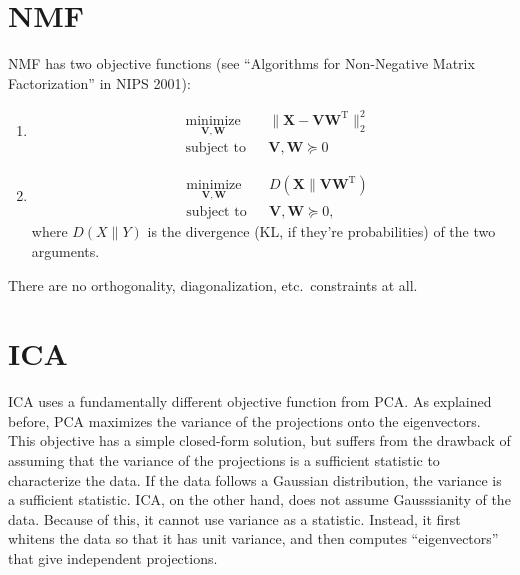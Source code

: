 \documentclass{article}
\newcommand{\transpose}{^\mathrm{T}}
\begin{document}
\section*{NMF}
NMF has two objective functions (see ``Algorithms for Non-Negative Matrix Factorization'' in NIPS 2001):
\begin{enumerate}
\item \begin{equation}
\begin{aligned}
&\underset{\mathbf{V}, \mathbf{W}}{\text{minimize}} &&\| \mathbf{X} - \mathbf{VW}\transpose\|_2^2 \\ 
& \text{subject to} & &\mathbf{V,W} \succeq 0 
\end{aligned}
\end{equation}
\item
\begin{equation}
\begin{aligned}
&\underset{\mathbf{V}, \mathbf{W}}{\text{minimize}} && D\left(\mathbf{X} \|  \mathbf{VW}\transpose\right) \\ 
& \text{subject to} & &\mathbf{V,W} \succeq 0, 
\end{aligned}
\end{equation}
where $D\left(X\|Y\right)$ is the divergence (KL, if they're probabilities) of the two arguments.
\end{enumerate}
There are no orthogonality, diagonalization, etc.\ constraints at all. 

\section*{ICA}
ICA uses a fundamentally different objective function from PCA. As explained before,  PCA maximizes the variance of the projections onto the eigenvectors.  This objective has a simple closed-form solution, but suffers from the drawback of assuming that the variance of the projections is a sufficient statistic to characterize the data.  If the data follows a Gaussian distribution, the variance is a sufficient statistic.  ICA, on the other hand, does not assume Gausssianity of the data.  Because of this, it cannot use variance as a statistic.  Instead, it first whitens the data so that it has unit variance, and then computes ``eigenvectors'' that give independent projections. 
\end{document}
